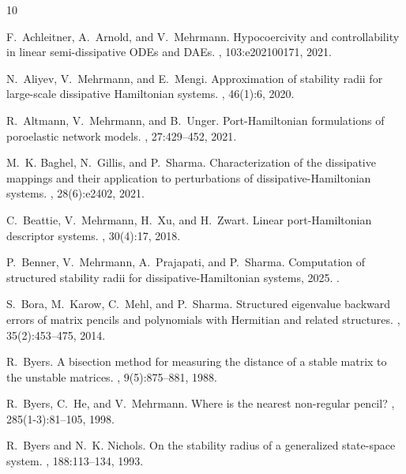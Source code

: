 \documentclass[11pt]{article}
\begin{document}
\begin{thebibliography}{10}

F.~Achleitner, A.~Arnold, and V.~Mehrmann.
\newblock Hypocoercivity and controllability in linear semi-dissipative {ODEs}
  and {DAEs}.
, 103:e202100171, 2021.

N.~Aliyev, V.~Mehrmann, and E.~Mengi.
\newblock Approximation of stability radii for large-scale dissipative
  {H}amiltonian systems.
, 46(1):6, 2020.

R.~Altmann, V.~Mehrmann, and B.~Unger.
\newblock Port-{H}amiltonian formulations of poroelastic network models.
,
  27:429--452, 2021.

M.~K. Baghel, N.~Gillis, and P.~Sharma.
\newblock Characterization of the dissipative mappings and their application to
  perturbations of dissipative-{H}amiltonian systems.
, 28(6):e2402, 2021.

C.~Beattie, V.~Mehrmann, H.~Xu, and H.~Zwart.
\newblock Linear port-{H}amiltonian descriptor systems.
, 30(4):17, 2018.

P.~Benner, V.~Mehrmann, A.~Prajapati, and P.~Sharma.
\newblock Computation of structured stability radii for
  dissipative-{H}amiltonian systems, 2025.
\newblock \href {http://arxiv.org/abs/2511.14935} {}.

S.~Bora, M.~Karow, C.~Mehl, and P.~Sharma.
\newblock Structured eigenvalue backward errors of matrix pencils and
  polynomials with {H}ermitian and related structures.
,
  35(2):453--475, 2014.

R.~Byers.
\newblock A bisection method for measuring the distance of a stable matrix to
  the unstable matrices.
,
  9(5):875--881, 1988.

R.~{Byers}, C.~{He}, and V.~{Mehrmann}.
\newblock Where is the nearest non-regular pencil?
, 285(1-3):81--105, 1998.

R.~Byers and N.~K. Nichols.
\newblock On the stability radius of a generalized state-space system.
, 188:113--134, 1993.


\end{thebibliography}
\end{document}
